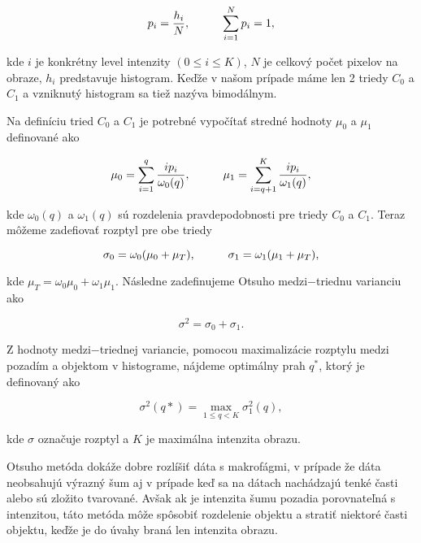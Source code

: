 \documentclass[a4paper,11pt,twoside]{article}%
\begin{document}
\begin{equation*}
p_i = \frac{h_i}{N}, \hspace{10mm}  \sum_{i=1}^{N} p_i = 1,
\end{equation*}

kde $i$ je konkrétny level intenzity $(0 \leq i \leq K)$, $N$ je celkový počet pixelov na obraze, $h_i$ predstavuje histogram. 
Keďže v našom prípade máme len 2 triedy $C_0$ a $C_1$ a vzniknutý histogram sa tiež nazýva bimodálnym.

Na definíciu tried $C_0$ a $C_1$ je potrebné vypočítať stredné hodnoty $\mu_0$ a $\mu_1$ definované ako

\begin{equation*}
\mu_0 =  \sum_{i=1}^{q}\frac{i p_i}{\omega_0(q)}, \hspace{10mm} \mu_1 =  \sum_{i=q + 1}^{K}\frac{i p_i}{\omega_1(q)},
\end{equation*}

kde $\omega_0(q)$ a $\omega_1(q)$ sú rozdelenia pravdepodobnosti pre triedy $C_0$ a $C_1$. Teraz môžeme zadefiovať rozptyl pre obe triedy

\begin{equation*}
\sigma_0 = \omega_0(\mu_0 + \mu_T), \hspace{10mm} \sigma_1 =  \omega_1(\mu_1 + \mu_T),
\end{equation*}

kde $ \mu_T = \omega_0\mu_0 + \omega_1\mu_1$. Následne zadefinujeme Otsuho medzi$-$triednu varianciu ako

\begin{equation*}
\sigma^2 = \sigma_0 + \sigma_1.
\end{equation*}

Z hodnoty medzi$-$triednej variancie, pomocou maximalizácie rozptylu medzi pozadím a objektom v histograme, nájdeme optimálny prah $q^*$, ktorý je definovaný ako

\begin{equation*}
\sigma^2(q*) = \max_{1 \leq q < K} \sigma^2_1(q),
\end{equation*}

kde $\sigma$ označuje rozptyl a $K$ je maximálna intenzita obrazu.

Otsuho metóda dokáže dobre rozlíšiť dáta s makrofágmi, v prípade že dáta neobsahujú výrazný šum aj v prípade keď sa na dátach nachádzajú tenké časti alebo sú zložito tvarované. Avšak ak je intenzita šumu pozadia porovnateľná s intenzitou, táto metóda môže spôsobiť rozdelenie objektu a stratiť niektoré časti objektu, keďže je do úvahy braná len intenzita obrazu.
\end{document}
